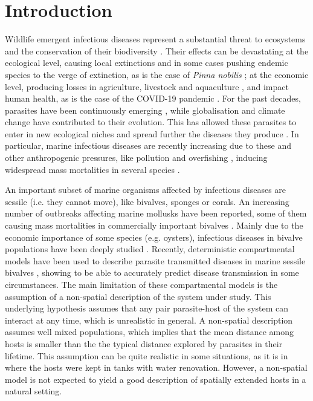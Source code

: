\section{Introduction}

Wildlife emergent infectious diseases represent a substantial threat to
ecosystems and the conservation of their biodiversity \cite{Daszak443}. Their
effects can be devastating at the ecological level, causing local extinctions
\cite{Daszak443} and in some cases pushing endemic species to the verge of
extinction, as is the case of \textit{Pinna nobilis}
\cite{Cabanellas2019}; at the economic level, producing losses in agriculture,
livestock and aquaculture \cite{Vurro2010, Tomley2009, Pernet2016}, and impact
human health, as is the case of the COVID-19 pandemic \cite{Salata2020}. For
the past decades, parasites have been continuously emerging \cite{Morens2004,
    Daszak2017}, while globalisation and climate change have contributed to
their
evolution. This has allowed these parasites to enter in new ecological niches
and spread further the diseases they produce \cite{Aguirre2008}. In particular,
marine infectious diseases are recently increasing due to these and other
anthropogenic pressures, like pollution and overfishing \cite{Lafferty2004},
inducing widespread mass mortalities in several species \cite{Eisenlord2016,
    JONES201648, VAZQUEZ2017}.

An important subset of marine organisms affected by infectious diseases are
sessile (i.e. they cannot move), like bivalves, sponges or corals. An
increasing number of outbreaks affecting marine mollusks have been reported,
some of them causing mass mortalities in commercially important bivalves
\cite{Guo2016}. Mainly due to the economic importance of some species (e.g.
oysters), infectious diseases in bivalve populations have been deeply studied
\cite{Petton2021, Pernet2018, McLaughlin2005, powell1999modeling}. Recently,
deterministic compartmental models have been used to describe parasite
transmitted diseases in marine sessile bivalves \cite{BIDEGAIN_2016_2,
    BIDEGAIN_perkinsus, GimenezRomero2021}, showing to be able to accurately
predict disease transmission in some circumstances. The main limitation of
these compartmental models is the assumption of a non-spatial description of
the system under study. This underlying hypothesis assumes that any pair
parasite-host of the system can interact at any time, which is unrealistic in
general. A non-spatial description assumes well mixed populations, which
implies that the mean distance among hosts is smaller than the the typical
distance explored by parasites in their lifetime. This assumption can be quite
realistic in some situations, as it is in \cite{GimenezRomero2021} where the
hosts were kept in tanks with water renovation. However, a non-spatial model is
not expected to yield a good description of spatially extended hosts in a
natural setting.

